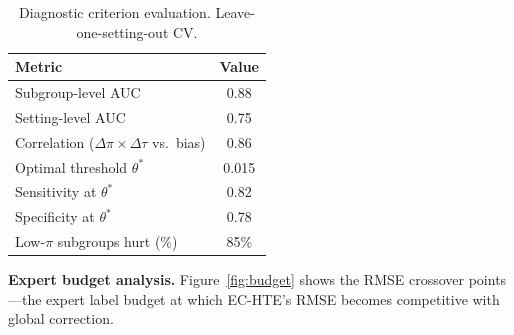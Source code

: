 \documentclass[11pt,twocolumn]{article}
\theoremstyle{remark}
\begin{document}
\begin{table}[t]
\centering
\small
\caption{Diagnostic criterion evaluation. Leave-one-setting-out CV.}
\label{tab:diagnostic}
\begin{tabular}{lc}
\toprule
Metric & Value \\
\midrule
Subgroup-level AUC & 0.88 \\
Setting-level AUC & 0.75 \\
Correlation ($\Delta\pi \times \Delta\tau$ vs.\ bias) & 0.86 \\
Optimal threshold $\theta^*$ & 0.015 \\
Sensitivity at $\theta^*$ & 0.82 \\
Specificity at $\theta^*$ & 0.78 \\
Low-$\pi$ subgroups hurt (\%) & 85\% \\
\bottomrule
\end{tabular}
\end{table}

\textbf{Expert budget analysis.}
Figure~\ref{fig:budget} shows the RMSE crossover points---the expert label budget at which EC-HTE's RMSE becomes competitive with global correction.
\end{document}
